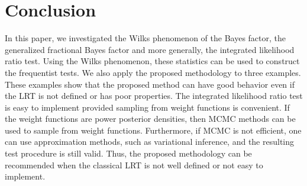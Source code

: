 \documentclass[11pt]{article}
\theoremstyle{plain}
\theoremstyle{definition}
\theoremstyle{remark}
\begin{document}



\section{Conclusion}
In this paper, we investigated the Wilks phenomenon of the Bayes factor, the generalized fractional Bayes factor and more generally, the integrated likelihood ratio test.
Using the Wilks phenomenon, these statistics can be used to construct the frequentist tests.
We also apply the proposed methodology to three examples.
These examples show that the proposed method can have good behavior even if the LRT is not defined or has poor properties.
The integrated likelihood ratio test is easy to implement provided sampling from weight functions is convenient.
If the weight functions are power posterior densities, then MCMC methods can be used to sample from weight functions.
Furthermore, if MCMC is not efficient, one can use approximation methods, such as variational inference, and the resulting test procedure is still valid.
Thus, the proposed methodology can be recommended when the classical LRT is not well defined or not easy to implement.






\end{document}
